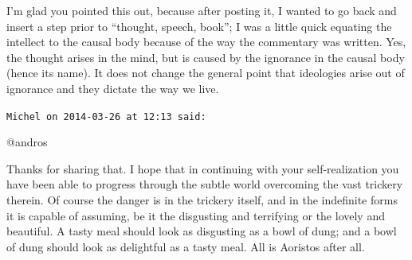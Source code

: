 \begin{footnotesize}
\begin{sffamily}
I'm glad you pointed this out, because after posting it, I wanted to go back and insert a step prior to ``thought, speech, book''; I was a little quick equating the intellect to the causal body because of the way the commentary was written. Yes, the thought arises in the mind, but is caused by the ignorance in the causal body (hence its name). It does not change the general point that ideologies arise out of ignorance and they dictate the way we live.

\hfill

\texttt{Michel on 2014-03-26 at 12:13 said:}

@andros

Thanks for sharing that. I hope that in continuing with your self-realization you have been able to progress through the subtle world overcoming the vast trickery therein. Of course the danger is in the trickery itself, and in the indefinite forms it is capable of assuming, be it the disgusting and terrifying or the lovely and beautiful. A tasty meal should look as disgusting as a bowl of dung; and a bowl of dung should look as delightful as a tasty meal. All is Aoristos after all.

\end{sffamily}
\end{footnotesize}

